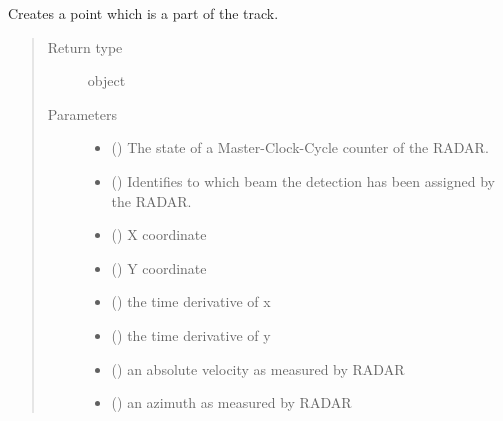 \documentclass[letterpaper,10pt,english]{Reference manual}
\begin{document}
\begin{fulllineitems}
\label{\detokenize{datacontainers:data_containers.TrackPoint}}
Creates a point which is a part of the track.
\begin{quote}\begin{description}
\item[{Return type}] \leavevmode
object

\item[{Parameters}] \leavevmode\begin{itemize}
\item {} 
 () \textendash{} The state of a Master-Clock-Cycle counter of the RADAR.

\item {} 
 () \textendash{} Identifies to which beam the detection has been assigned by the RADAR.

\item {} 
 () \textendash{} X coordinate

\item {} 
 () \textendash{} Y coordinate

\item {} 
 () \textendash{} the time derivative of x

\item {} 
 () \textendash{} the time derivative of y

\item {} 
 () \textendash{} an absolute velocity as measured by RADAR

\item {} 
 () \textendash{} an azimuth as measured by RADAR

\end{itemize}

\end{description}\end{quote}


\end{fulllineitems}
\end{document}
